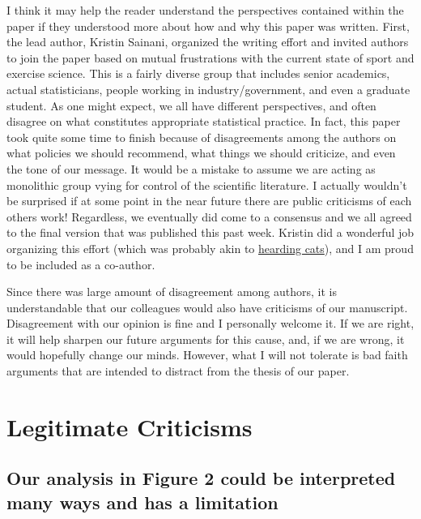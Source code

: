 \documentclass[
]{article}
\begin{document}
I think it may help the reader understand the perspectives contained
within the paper if they understood more about how and why this paper
was written. First, the lead author, Kristin Sainani, organized the
writing effort and invited authors to join the paper based on mutual
frustrations with the current state of sport and exercise science. This
is a fairly diverse group that includes senior academics, actual
statisticians, people working in industry/government, and even a
graduate student. As one might expect, we all have different
perspectives, and often disagree on what constitutes appropriate
statistical practice. In fact, this paper took quite some time to finish
because of disagreements among the authors on what policies we should
recommend, what things we should criticize, and even the tone of our
message. It would be a mistake to assume we are acting as monolithic
group vying for control of the scientific literature. I actually
wouldn't be surprised if at some point in the near future there are
public criticisms of each others work! Regardless, we eventually did
come to a consensus and we all agreed to the final version that was
published this past week. Kristin did a wonderful job organizing this
effort (which was probably akin to
\href{https://www.youtube.com/watch?v=m_MaJDK3VNE}{hearding cats}), and
I am proud to be included as a co-author.

Since there was large amount of disagreement among authors, it is
understandable that our colleagues would also have criticisms of our
manuscript. Disagreement with our opinion is fine and I personally
welcome it. If we are right, it will help sharpen our future arguments
for this cause, and, if we are wrong, it would hopefully change our
minds. However, what I will not tolerate is bad faith arguments that are
intended to distract from the thesis of our paper.

\hypertarget{legitimate-criticisms}{%
\section{Legitimate Criticisms}\label{legitimate-criticisms}}

\hypertarget{our-analysis-in-figure-2-could-be-interpreted-many-ways-and-has-a-limitation}{%
\subsection{Our analysis in Figure 2 could be interpreted many ways and
has a
limitation}\label{our-analysis-in-figure-2-could-be-interpreted-many-ways-and-has-a-limitation}}
\end{document}
